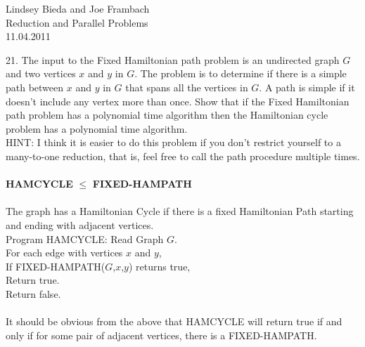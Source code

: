 \documentclass[10pt]{article}
\newcommand{\tab}{\hspace*{2em}}
\newcommand{\tabb}{\hspace*{4em}}
\newcommand{\tabbb}{\hspace*{6em}}
\begin{document}
	\begin{flushright}
	Lindsey Bieda and Joe Frambach\\
	Reduction and Parallel Problems\\
	11.04.2011
	\end{flushright}

21. The input to the Fixed Hamiltonian path problem is an undirected graph $G$ and two vertices $x$ and $y$
in $G$. The problem is to determine if there is a simple path between $x$ and $y$ in $G$ that spans all the
vertices in $G$. A path is simple if it doesn't include any vertex more than once. Show that if the Fixed
Hamiltonian path problem has a polynomial time algorithm then the Hamiltonian cycle problem has
a polynomial time algorithm.\\
HINT: I think it is easier to do this problem if you don't restrict yourself to a many-to-one reduction,
that is, feel free to call the path procedure multiple times.\\
\\
\textbf{HAMCYCLE} $\leq$ \textbf{FIXED-HAMPATH}\\
\\
The graph has a Hamiltonian Cycle if there is a fixed Hamiltonian Path starting and ending with adjacent vertices.\\
Program HAMCYCLE:
\tab Read Graph $G$.\\
\tab For each edge with vertices $x$ and $y$,\\
\tabb If FIXED-HAMPATH($G$,$x$,$y$) returns true,\\
\tabbb Return true.\\
\tab Return false.\\
\\
It should be obvious from the above that HAMCYCLE will return true if and only if for some pair of adjacent vertices,
there is a FIXED-HAMPATH.
\end{document}
